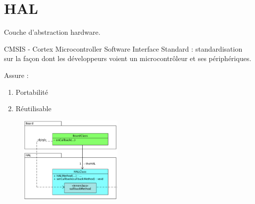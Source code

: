\section{HAL}
Couche d'abstraction hardware.

CMSIS - Cortex Microcontroller Software Interface Standard : standardisation sur la façon dont les développeurs voient un microcontrôleur et ses périphériques.

Assure :
\begin{enumerate}
    \item Portabilité
    \item Réutilisable
\end{enumerate}
\begin{figure}[H]
    \centering
    \includegraphics[width=5.00cm]{figures/HAL.png}
\end{figure}